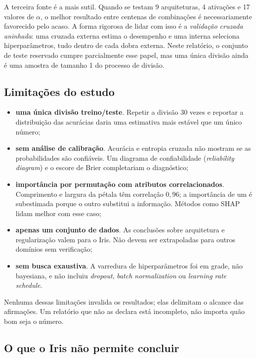 A terceira fonte é a mais sutil. Quando se testam 9 arquiteturas, 4 ativações e 17 valores de
$\alpha$, o melhor resultado entre centenas de combinações é necessariamente favorecido pelo acaso.
A forma rigorosa de lidar com isso é a \emph{validação cruzada aninhada}: uma cruzada externa
estima o desempenho e uma interna seleciona hiperparâmetros, tudo dentro de cada dobra externa.
Neste relatório, o conjunto de teste reservado cumpre parcialmente esse papel, mas uma única
divisão ainda é uma amostra de tamanho 1 do processo de divisão.

\subsection{Limitações do estudo}

\begin{itemize}
	\item \textbf{uma única divisão treino/teste}. Repetir a divisão 30 vezes e reportar a
	      distribuição das acurácias daria uma estimativa mais estável que um único número;
	\item \textbf{sem análise de calibração}. Acurácia e entropia cruzada não mostram se as
	      probabilidades são confiáveis. Um diagrama de confiabilidade (\emph{reliability diagram})
	      e o escore de Brier completariam o diagnóstico;
	\item \textbf{importância por permutação com atributos correlacionados}. Comprimento e largura
	      da pétala têm correlação $0{,}96$; a importância de um é subestimada porque o outro
	      substitui a informação. Métodos como SHAP lidam melhor com esse caso;
	\item \textbf{apenas um conjunto de dados}. As conclusões sobre arquitetura e regularização
	      valem para o Iris. Não devem ser extrapoladas para outros domínios sem verificação;
	\item \textbf{sem busca exaustiva}. A varredura de hiperparâmetros foi em grade, não bayesiana,
	      e não incluiu \emph{dropout}, \emph{batch normalization} ou \emph{learning rate schedule}.
\end{itemize}

Nenhuma dessas limitações invalida os resultados; elas delimitam o alcance das afirmações. Um
relatório que não as declara está incompleto, não importa quão bom seja o número.

\subsection{O que o Iris não permite concluir}

